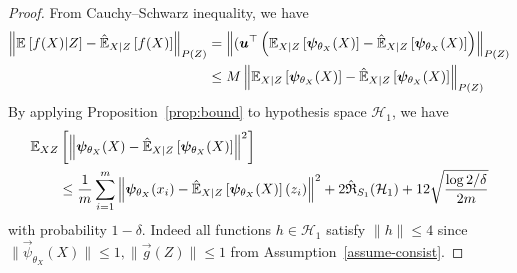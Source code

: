 \begin{proof}
     From Cauchy–Schwarz inequality, we have
\begin{align*}
    \left\| \expect{f(X)\middle|Z} - \hatexpect[X|Z]{f(X)} \right\|_{P(Z)} 
    &= \left\| (\vec{u}^\top \left(\expect[X|Z]{\vec{\psi}_{\theta_X}(X)} - \hatexpect[X|Z]{\vec{\psi}_{\theta_X}(X)} \right)\right\|_{P(Z)}\\
    &\leq M\left\|\expect[X|Z]{\vec{\psi}_{\theta_X}(X)} - \hatexpect[X|Z]{\vec{\psi}_{{\theta}_X}(X)} \right\|_{P(Z)}
\end{align*}
By applying Proposition~\ref{prop:bound} to hypothesis space $\mathcal{H}_1$, we have
\begin{align*}
    &\expect[XZ]{\left\|\vec{\psi}_{\theta_X}(X) - \hatexpect[X|Z]{\vec{\psi}_{\theta_X}(X)}\right\|^2} \nonumber\\
    &\quad\quad \leq  \frac1m \sum_{i=1}^m {\left\|\vec{\psi}_{\theta_X}(x_i)- \hatexpect[X|Z]{\vec{\psi}_{\theta_X}(X) }(z_i)\right\|^2} +  2\hat{\mathfrak{R}}_{S_1}(\mathcal{H}_1) + 12\sqrt{\frac{\log 2/\delta}{2m}}
\end{align*}
with probability $1-\delta$. Indeed all functions $h \in \mathcal{H}_1$ satisfy $\|h\| \leq 4$ since $\|\vec{\psi}_{\theta_X}(X)\| \leq 1, \|\vec{g}(Z)\| \leq 1$ from Assumption~\ref{assume-consist}.


\end{proof}
